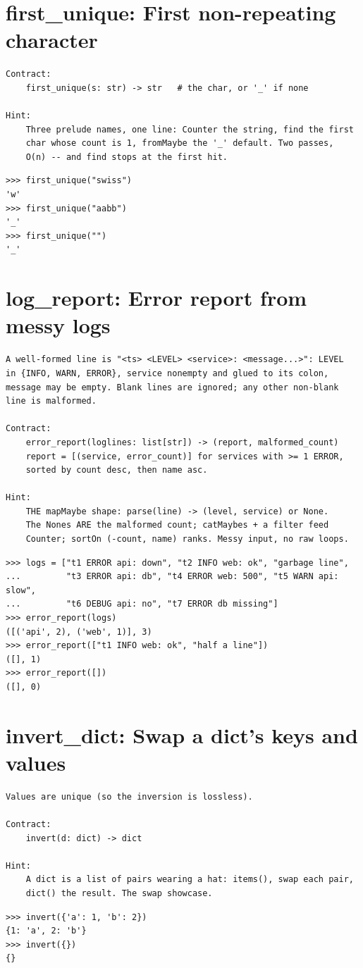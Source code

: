 \documentclass[10pt,letterpaper]{book}
\begin{document}
\section{first\_unique: First non-repeating character}
\begin{lstlisting}[style=ex]
Contract:
    first_unique(s: str) -> str   # the char, or '_' if none

Hint:
    Three prelude names, one line: Counter the string, find the first
    char whose count is 1, fromMaybe the '_' default. Two passes,
    O(n) -- and find stops at the first hit.
\end{lstlisting}
\begin{lstlisting}[style=ex]
>>> first_unique("swiss")
'w'
>>> first_unique("aabb")
'_'
>>> first_unique("")
'_'
\end{lstlisting}

\section{log\_report: Error report from messy logs}
\begin{lstlisting}[style=ex]
A well-formed line is "<ts> <LEVEL> <service>: <message...>": LEVEL
in {INFO, WARN, ERROR}, service nonempty and glued to its colon,
message may be empty. Blank lines are ignored; any other non-blank
line is malformed.

Contract:
    error_report(loglines: list[str]) -> (report, malformed_count)
    report = [(service, error_count)] for services with >= 1 ERROR,
    sorted by count desc, then name asc.

Hint:
    THE mapMaybe shape: parse(line) -> (level, service) or None.
    The Nones ARE the malformed count; catMaybes + a filter feed
    Counter; sortOn (-count, name) ranks. Messy input, no raw loops.
\end{lstlisting}
\begin{lstlisting}[style=ex]
>>> logs = ["t1 ERROR api: down", "t2 INFO web: ok", "garbage line",
...         "t3 ERROR api: db", "t4 ERROR web: 500", "t5 WARN api: slow",
...         "t6 DEBUG api: no", "t7 ERROR db missing"]
>>> error_report(logs)
([('api', 2), ('web', 1)], 3)
>>> error_report(["t1 INFO web: ok", "half a line"])
([], 1)
>>> error_report([])
([], 0)
\end{lstlisting}

\section{invert\_dict: Swap a dict's keys and values}
\begin{lstlisting}[style=ex]
Values are unique (so the inversion is lossless).

Contract:
    invert(d: dict) -> dict

Hint:
    A dict is a list of pairs wearing a hat: items(), swap each pair,
    dict() the result. The swap showcase.
\end{lstlisting}
\begin{lstlisting}[style=ex]
>>> invert({'a': 1, 'b': 2})
{1: 'a', 2: 'b'}
>>> invert({})
{}
\end{lstlisting}
\end{document}
